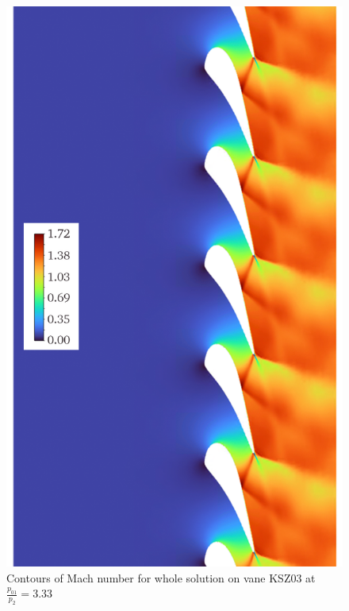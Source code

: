 \documentclass[a4paper, 11pt, oneside]{report}
\begin{document}
\begin{figure}[H]
      \centering
      \includegraphics[width=.85\textwidth]{figs/t900_mach_whole.png}
      \caption{Contours of Mach number for whole solution on vane KSZ03 at $\frac{p_{01}}{p_2}=3.33$}
      \label{fig:t900_mach_whole}
\end{figure}
\end{document}
